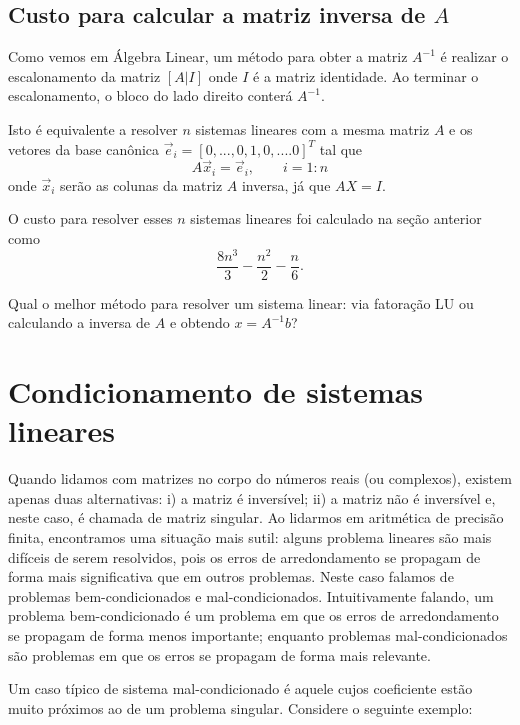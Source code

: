 \subsection{Custo para calcular a matriz inversa de $A$}
Como vemos em Álgebra Linear, um método para obter a matriz $A^{-1}$ é realizar o escalonamento da matriz $[A|I]$ onde $I$ é a matriz identidade. Ao terminar o escalonamento, o bloco do lado direito conterá $A^{-1}$.

Isto é equivalente a resolver $n$ sistemas lineares com a mesma matriz $A$ e os vetores da base canônica $\vec e_i = [0,...,0,1,0,....0]^T$ tal que
$$ A \vec x_i = \vec e_i, \quad\quad i=1:n $$
onde $\vec x_i$ serão as colunas da matriz $A$ inversa, já que $A X=I$.

O custo para resolver esses $n$ sistemas lineares foi calculado na seção anterior como
$$\frac{8n^3}{3}-\frac{n^2}{2}-\frac{n}{6}.$$

\begin{ex}
 Qual o melhor método para resolver um sistema linear: via fatoração LU ou calculando a inversa de $A$ e obtendo $x=A^{-1}b$?
\end{ex}


\section{Condicionamento de sistemas lineares}

Quando lidamos com matrizes no corpo do números reais (ou complexos), existem apenas duas alternativas: i) a matriz é inversível; ii) a matriz não é inversível e, neste caso, é chamada de matriz singular. Ao lidarmos em aritmética de precisão finita, encontramos uma situação mais sutil: alguns problema lineares são mais difíceis de serem resolvidos, pois os erros de arredondamento se propagam de forma mais significativa que em outros problemas. Neste caso falamos de problemas bem-condicionados e mal-condicionados. Intuitivamente falando, um problema bem-condicionado é um problema em que os erros de arredondamento se propagam de forma menos importante; enquanto problemas mal-condicionados são problemas em que os erros se propagam de forma mais relevante.

Um caso típico de sistema mal-condicionado é aquele cujos coeficiente estão muito próximos ao de um problema singular. Considere o seguinte exemplo:

